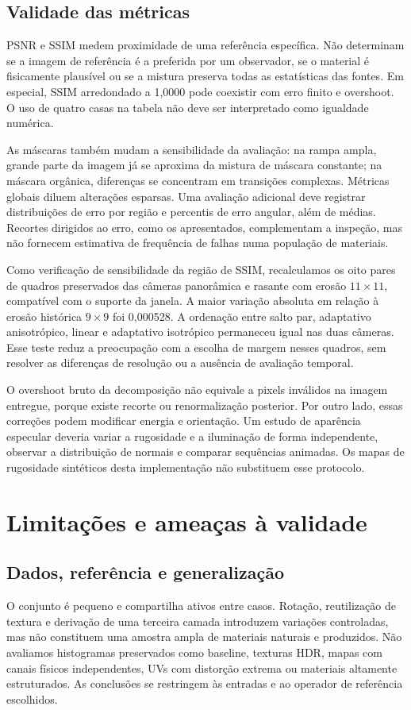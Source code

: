 \subsection{Validade das métricas}
PSNR e SSIM medem proximidade de uma referência específica. Não determinam se a imagem de referência é a preferida por um observador, se o material é fisicamente plausível ou se a mistura preserva todas as estatísticas das fontes. Em especial, SSIM arredondado a 1,0000 pode coexistir com erro finito e overshoot. O uso de quatro casas na tabela não deve ser interpretado como igualdade numérica.

As máscaras também mudam a sensibilidade da avaliação: na rampa ampla, grande parte da imagem já se aproxima da mistura de máscara constante; na máscara orgânica, diferenças se concentram em transições complexas. Métricas globais diluem alterações esparsas. Uma avaliação adicional deve registrar distribuições de erro por região e percentis de erro angular, além de médias. Recortes dirigidos ao erro, como os apresentados, complementam a inspeção, mas não fornecem estimativa de frequência de falhas numa população de materiais.

Como verificação de sensibilidade da região de SSIM, recalculamos os oito pares de quadros preservados das câmeras panorâmica e rasante com erosão $11\times11$, compatível com o suporte da janela. A maior variação absoluta em relação à erosão histórica $9\times9$ foi 0,000528. A ordenação entre salto par, adaptativo anisotrópico, linear e adaptativo isotrópico permaneceu igual nas duas câmeras. Esse teste reduz a preocupação com a escolha de margem nesses quadros, sem resolver as diferenças de resolução ou a ausência de avaliação temporal.

O overshoot bruto da decomposição não equivale a pixels inválidos na imagem entregue, porque existe recorte ou renormalização posterior. Por outro lado, essas correções podem modificar energia e orientação. Um estudo de aparência especular deveria variar a rugosidade e a iluminação de forma independente, observar a distribuição de normais e comparar sequências animadas. Os mapas de rugosidade sintéticos desta implementação não substituem esse protocolo.

\section{Limitações e ameaças à validade}
\subsection{Dados, referência e generalização}
O conjunto é pequeno e compartilha ativos entre casos. Rotação, reutilização de textura e derivação de uma terceira camada introduzem variações controladas, mas não constituem uma amostra ampla de materiais naturais e produzidos. Não avaliamos histogramas preservados como baseline, texturas HDR, mapas com canais físicos independentes, UVs com distorção extrema ou materiais altamente estruturados. As conclusões se restringem às entradas e ao operador de referência escolhidos.

